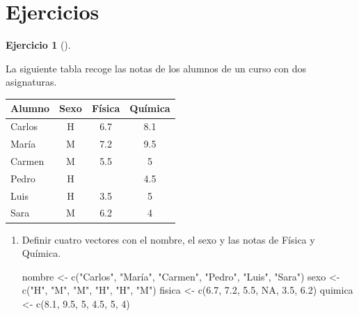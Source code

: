 \documentclass[
  a4paper,
]{scrreport}
\newenvironment{Shaded}{\begin{snugshade}}{\end{snugshade}}
\newcommand{\ConstantTok}[1]{\textcolor[rgb]{0.56,0.35,0.01}{#1}}
\newcommand{\DecValTok}[1]{\textcolor[rgb]{0.68,0.00,0.00}{#1}}
\newcommand{\FloatTok}[1]{\textcolor[rgb]{0.68,0.00,0.00}{#1}}
\newcommand{\FunctionTok}[1]{\textcolor[rgb]{0.28,0.35,0.67}{#1}}
\newcommand{\NormalTok}[1]{\textcolor[rgb]{0.00,0.23,0.31}{#1}}
\newcommand{\OtherTok}[1]{\textcolor[rgb]{0.00,0.23,0.31}{#1}}
\newcommand{\StringTok}[1]{\textcolor[rgb]{0.13,0.47,0.30}{#1}}
\theoremstyle{definition}
\newtheorem{exercise}{Ejercicio}[chapter]
\theoremstyle{definition}
\theoremstyle{remark}
\begin{document}
\section{Ejercicios}\label{ejercicios-1}

\begin{exercise}[]\protect\hypertarget{exr-datos-estructurados-1}{}\label{exr-datos-estructurados-1}

La siguiente tabla recoge las notas de los alumnos de un curso con dos
asignaturas.

\begin{longtable}[]{@{}lccc@{}}
\toprule\noalign{}
Alumno & Sexo & Física & Química \\
\midrule\noalign{}
\endhead
\bottomrule\noalign{}
\endlastfoot
Carlos & H & 6.7 & 8.1 \\
María & M & 7.2 & 9.5 \\
Carmen & M & 5.5 & 5 \\
Pedro & H & & 4.5 \\
Luis & H & 3.5 & 5 \\
Sara & M & 6.2 & 4 \\
\end{longtable}

\begin{enumerate}
\def\labelenumi{\alph{enumi}.}
\item
  Definir cuatro vectores con el nombre, el sexo y las notas de Física y
  Química.

  \begin{tcolorbox}[enhanced jigsaw, title=\textcolor{quarto-callout-note-color}{\faInfo}\hspace{0.5em}{Solución}, titlerule=0mm, toprule=.15mm, colbacktitle=quarto-callout-note-color!10!white, arc=.35mm, colframe=quarto-callout-note-color-frame, opacitybacktitle=0.6, coltitle=black, left=2mm, colback=white, opacityback=0, breakable, bottomrule=.15mm, toptitle=1mm, leftrule=.75mm, bottomtitle=1mm, rightrule=.15mm]

\begin{Shaded}
\begin{Highlighting}[]
\NormalTok{nombre }\OtherTok{\textless{}{-}} \FunctionTok{c}\NormalTok{(}\StringTok{"Carlos"}\NormalTok{, }\StringTok{"María"}\NormalTok{, }\StringTok{"Carmen"}\NormalTok{, }\StringTok{"Pedro"}\NormalTok{, }\StringTok{"Luis"}\NormalTok{, }\StringTok{"Sara"}\NormalTok{)}
\NormalTok{sexo }\OtherTok{\textless{}{-}} \FunctionTok{c}\NormalTok{(}\StringTok{"H"}\NormalTok{, }\StringTok{"M"}\NormalTok{, }\StringTok{"M"}\NormalTok{, }\StringTok{"H"}\NormalTok{, }\StringTok{"H"}\NormalTok{, }\StringTok{"M"}\NormalTok{)}
\NormalTok{fisica }\OtherTok{\textless{}{-}} \FunctionTok{c}\NormalTok{(}\FloatTok{6.7}\NormalTok{, }\FloatTok{7.2}\NormalTok{, }\FloatTok{5.5}\NormalTok{, }\ConstantTok{NA}\NormalTok{, }\FloatTok{3.5}\NormalTok{, }\FloatTok{6.2}\NormalTok{)}
\NormalTok{quimica }\OtherTok{\textless{}{-}} \FunctionTok{c}\NormalTok{(}\FloatTok{8.1}\NormalTok{, }\FloatTok{9.5}\NormalTok{, }\DecValTok{5}\NormalTok{, }\FloatTok{4.5}\NormalTok{, }\DecValTok{5}\NormalTok{, }\DecValTok{4}\NormalTok{)}
\end{Highlighting}
\end{Shaded}


\end{tcolorbox}
\end{enumerate}
\end{exercise}
\end{document}
